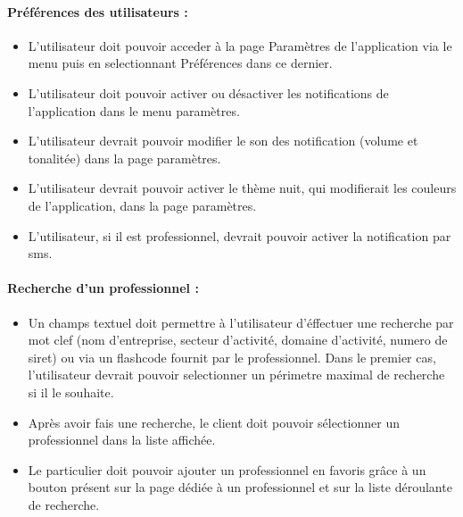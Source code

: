 \documentclass{article}
\begin{document}
\paragraph{Préférences des utilisateurs :}
\begin{itemize}
\item L'utilisateur doit pouvoir acceder à la page \og Paramètres \fg{} de l'application via le menu
 puis en selectionnant \og Préférences \fg{}
  dans ce dernier.
\item L'utilisateur doit pouvoir activer ou désactiver les notifications
  de l'application dans le menu paramètres.
\item L'utilisateur devrait pouvoir modifier le son des notification
  (volume et tonalitée) dans la page paramètres.
\item L'utilisateur devrait pouvoir activer le thème nuit, qui modifierait les
  couleurs de l'application, dans la page paramètres.
\item L'utilisateur, si il est professionnel, devrait pouvoir activer la notification par sms.
\end{itemize}
\paragraph{Recherche d'un professionnel :}
\begin{itemize}
\item Un champs textuel doit permettre à l'utilisateur d'éffectuer une
  recherche par mot clef (nom d'entreprise, secteur d'activité, domaine d'activité, numero de siret) ou via un flashcode fournit par le professionnel. Dans
  le premier cas, l'utilisateur devrait pouvoir selectionner
  un périmetre maximal de recherche si il le souhaite.
\item Après avoir fais une recherche, le client doit pouvoir sélectionner un
  professionnel dans la liste affichée.
\item Le particulier doit pouvoir ajouter un professionnel en favoris grâce
  à un bouton présent sur la page dédiée à un professionnel et sur la
  liste déroulante de recherche.


\end{itemize}
\end{document}
